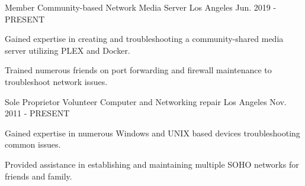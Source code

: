 


\begin{cventries}



\cventry
{Member} %
{Community-based Network Media Server} %
{Los Angeles} %
{Jun. 2019 - PRESENT} %
{ %
\begin{cvitems}
\item {Gained expertise in creating and troubleshooting a community-shared media server utilizing PLEX and Docker.}
\item {Trained numerous friends on port forwarding and firewall maintenance to troubleshoot network issues.}
\end{cvitems}
}


\cventry
{Sole Proprietor} %
{Volunteer Computer and Networking repair} %
{Los Angeles} %
{Nov. 2011 - PRESENT} %
{ %
\begin{cvitems}
\item {Gained expertise in numerous Windows and UNIX based devices troubleshooting common issues.}
\item {Provided assistance in establishing and maintaining multiple SOHO networks for friends and family.}
\end{cvitems}
}


\end{cventries}